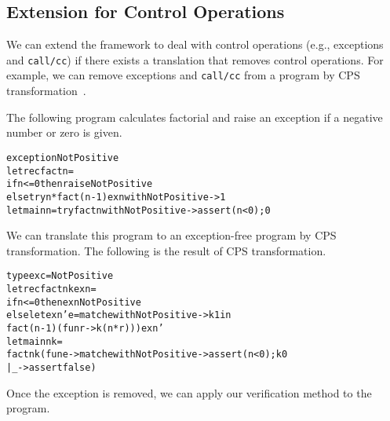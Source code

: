 \subsection{Extension for Control Operations}
\label{sec:control}
We can extend the framework to deal with control operations (e.g., exceptions and \texttt{call/cc}) if there
exists a translation that removes control operations.  For example,
we can remove exceptions and \texttt{call/cc} from a program by CPS transformation~\cite{Nielsen2001}.

The following program calculates factorial and raise an exception if
a negative number or zero is given.
\begin{alltt}
exception NotPositive
let rec fact n =
  if n <= 0 then raise NotPositive
  else try n * fact (n - 1) exn with NotPositive -> 1
let main n = try fact n with NotPositive -> assert (n < 0); 0
\end{alltt}
We can translate this program to an exception-free program by CPS transformation.
The following is the result of CPS transformation.
\begin{alltt}
type exc = NotPositive
let rec fact n k exn =
  if n <= 0 then exn NotPositive
  else let exn' e = match e with NotPositive -> k 1 in
         fact (n - 1) (fun r -> k (n * r))) exn'
let main n k =
  fact n k (fun e -> match e with NotPositive -> assert (n < 0); k 0
                                | _ -> assert false)
\end{alltt}
Once the exception is removed, we can apply our verification method to the
program.


